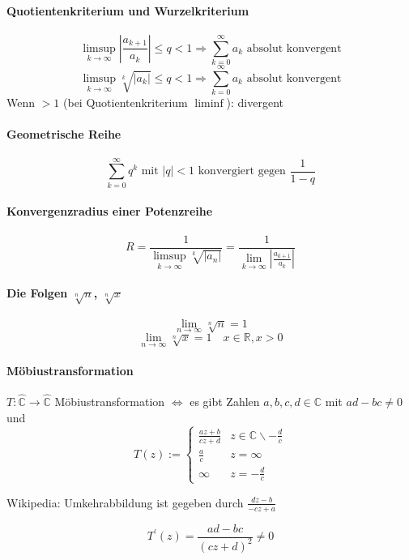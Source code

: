 \documentclass[a4paper, 10pt, DIV20, headings=small]{scrartcl}
\theoremstyle{definition}
\theoremstyle{plain}
\begin{document}
\paragraph{Quotientenkriterium und Wurzelkriterium}
$$\limsup\limits_{k \rightarrow \infty} \left|\frac{a_{k+1}}{a_k}\right| \leq q < 1 \Rightarrow \sum\limits_{k=0}^\infty a_k \text{ absolut konvergent}$$
$$\limsup\limits_{k \rightarrow \infty} \sqrt[k]{|a_k|} \leq q < 1 \Rightarrow \sum\limits_{k=0}^\infty a_k \text{ absolut konvergent}$$
Wenn $> 1$ (bei Quotientenkriterium $\liminf$): divergent

\paragraph{Geometrische Reihe}
$$\sum\limits_{k=0}^\infty q^k \text{ mit } |q| < 1 \text{ konvergiert gegen } \frac{1}{1-q}$$

\paragraph{Konvergenzradius einer Potenzreihe}
$$R = \frac{1}{\limsup\limits_{k\rightarrow \infty} \sqrt[k]{|a_n|}} = \frac{1}{\lim\limits_{k\rightarrow \infty}{|\frac{a_{k+1}}{a_k}|}}$$

\paragraph{Die Folgen $\sqrt[n]{n}$, $\sqrt[n]{x}$}
$$\lim_{n \rightarrow \infty} \sqrt[n]{n} = 1$$
$$\lim_{n \rightarrow \infty} \sqrt[n]{x} = 1 \quad x \in \mathbb{R}, x > 0$$

\paragraph{Möbiustransformation}
$T \colon \hat{\mathbb{C}} \rightarrow \hat{\mathbb{C}}$ Möbiustransformation $\Leftrightarrow$
es gibt Zahlen $a,b,c,d \in \mathbb{C}$ mit $ad-bc \neq 0$ und
$$T(z) := \begin{cases} \frac{az+b}{cz+d} & z \in \mathbb{C} \backslash -\frac{d}{c} \\
\frac{a}{c} & z = \infty \\
\infty & z = - \frac{d}{c} \end{cases}$$

Wikipedia: Umkehrabbildung ist gegeben durch $\frac{dz-b}{-cz+a}$

$$T^\prime(z) = \frac{ad-bc}{(cz+d)^2} \neq 0$$
\end{document}
